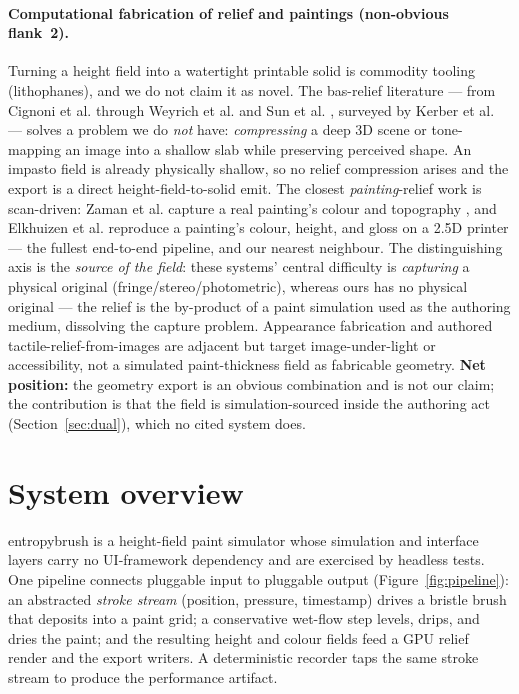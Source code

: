\documentclass[11pt]{article}
\begin{document}
\paragraph{Computational fabrication of relief and paintings (non-obvious flank~2).}
Turning a height field into a watertight printable solid is commodity tooling
(lithophanes), and we do not claim it as novel. The bas-relief literature --- from
Cignoni et al. \citep{cignoni1997relief} through Weyrich et al.
\citep{weyrich2007basrelief} and Sun et al. \citep{sun2009basrelief}, surveyed by
Kerber et al. \citep{kerber2012survey} --- solves a problem we do \emph{not} have:
\emph{compressing} a deep 3D scene or tone-mapping an image into a shallow slab
while preserving perceived shape. An impasto field is already physically shallow,
so no relief compression arises and the export is a direct height-field-to-solid
emit. The closest \emph{painting}-relief work is scan-driven: Zaman et al. capture
a real painting's colour and topography \citep{zaman2014capture}, and Elkhuizen et
al. reproduce a painting's colour, height, and gloss on a 2.5D printer
\citep{elkhuizen2019reproducing} --- the fullest end-to-end pipeline, and our
nearest neighbour. The distinguishing axis is the \emph{source of the field}:
these systems' central difficulty is \emph{capturing} a physical original
(fringe/stereo/photometric), whereas ours has no physical original --- the relief
is the by-product of a paint simulation used as the authoring medium, dissolving
the capture problem. Appearance fabrication
\citep{matusik2009reflectance,alexa2010reliefs,schuller2014appearance} and authored
tactile-relief-from-images \citep{reichinger2011tactile} are adjacent but target
image-under-light or accessibility, not a simulated paint-thickness field as
fabricable geometry. \textbf{Net position:} the geometry export is an obvious
combination and is not our claim; the contribution is that the field is
simulation-sourced inside the authoring act (Section~\ref{sec:dual}), which no
cited system does.

\section{System overview}
\label{sec:system}

entropybrush is a height-field paint simulator whose simulation and interface
layers carry no UI-framework dependency and are exercised by headless tests. One
pipeline connects pluggable input to pluggable output
(Figure~\ref{fig:pipeline}): an abstracted \emph{stroke stream} (position,
pressure, timestamp) drives a bristle brush that deposits into a paint grid; a
conservative wet-flow step levels, drips, and dries the paint; and the resulting
height and colour fields feed a GPU relief render and the export writers. A
deterministic recorder taps the same stroke stream to produce the performance
artifact.
\end{document}

